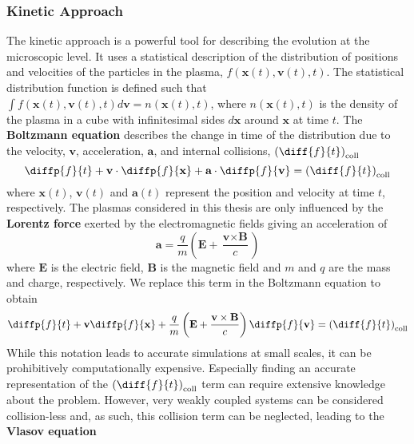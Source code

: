 \subsubsection{Kinetic Approach}
The kinetic approach is a powerful tool for describing the evolution at the microscopic level. It uses a statistical description of the distribution of positions and velocities of the particles in the plasma, $f(\textbf{x}(t), \textbf{v}(t),t)$. The statistical distribution function is defined such that $\int f(\textbf{x}(t),\textbf{v}(t),t)d\textbf{v} = n(\textbf{x}(t),t)$, where $n(\textbf{x}(t),t)$ is the density of the plasma in a cube with infinitesimal sides $d\textbf{x}$ around $\textbf{x}$ at time $t$. The \textbf{Boltzmann equation} describes the change in time of the distribution due to the velocity, $\textbf{v}$, acceleration, $\textbf{a}$, and internal collisions, $\left(\diff{f}{t}\right)_{\mathrm{coll}}$
\begin{equation}
\label{eq: Boltzmann}
    \diffp{f}{t} + \textbf{v} \cdot \diffp{f}{{\textbf{x}}} + \textbf{a} \cdot \diffp{f}{{\textbf{v}}}= \left(\diff{f}{t}\right)_{\mathrm{coll}}
\end{equation}
where $\textbf{x}(t)$, $\textbf{v}(t)$ and $\textbf{a}(t)$ represent the position and velocity at time $t$, respectively. The plasmas considered in this thesis are only influenced by the \textbf{Lorentz force} exerted by the electromagnetic fields giving an acceleration of
 \begin{equation}
 \label{eq: Lorentz}
     \textbf{a} = \frac{q}{m}\left(\textbf{E} + \frac{\textbf{v} \times \textbf{B}}{c}\right)
 \end{equation}
 where $\textbf{E}$ is the electric field, $\textbf{B}$ is the magnetic field and $m$ and $q$ are the mass and charge, respectively.
 We replace this term in the Boltzmann equation to obtain
\begin{equation}
    \diffp{f}{t} + \textbf{v} \diffp{f}{{\textbf{x}}} + \frac{q}{m}\left( \textbf{E} + \frac{\textbf{v} \times \textbf{B}}{c}\right)\diffp{f}{{\textbf{v}}}= \left(\diff{f}{t}\right)_{\mathrm{coll}}
\end{equation}
While this notation leads to accurate simulations at small scales, it can be prohibitively computationally expensive. Especially finding an accurate representation of the $\left(\diff{f}{t}\right)_{\mathrm{coll}}$ term can require extensive knowledge about the problem. However, very weakly coupled systems can be considered collision-less and, as such, this collision term can be neglected, leading to the \textbf{Vlasov equation} \cite{A_Vlasov_1968}

